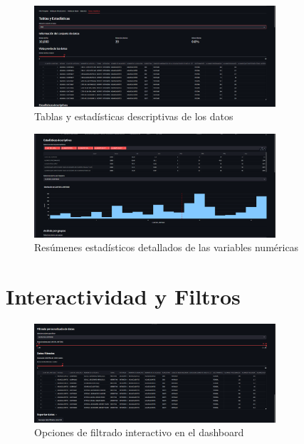 \begin{figure}[h]
    \centering
    \includegraphics[width=0.8\textwidth]{../imagenes/tabla y estadisticas.png}
    \caption{Tablas y estadísticas descriptivas de los datos}
    \label{fig:tablas_estadisticas}
\end{figure}

\begin{figure}[h]
    \centering
    \includegraphics[width=0.8\textwidth]{../imagenes/estadisticas descripticas.png}
    \caption{Resúmenes estadísticos detallados de las variables numéricas}
    \label{fig:estadisticas_descriptivas}
\end{figure}

\section{Interactividad y Filtros}

\begin{figure}[h]
    \centering
    \includegraphics[width=0.8\textwidth]{../imagenes/filtrado de datos.png}
    \caption{Opciones de filtrado interactivo en el dashboard}
    \label{fig:filtrado_datos}
\end{figure}

